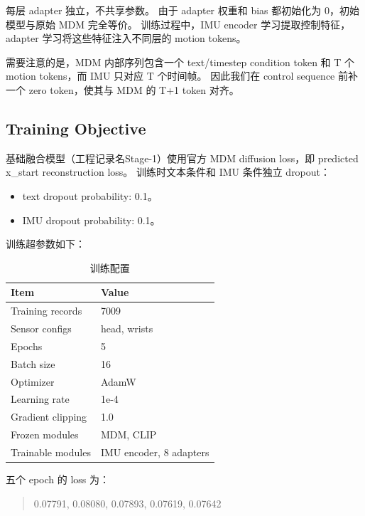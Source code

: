 每层 adapter 独立，不共享参数。
由于 adapter 权重和 bias 都初始化为 0，初始模型与原始 MDM 完全等价。
训练过程中，IMU encoder 学习提取控制特征，adapter 学习将这些特征注入不同层的 motion tokens。

需要注意的是，MDM 内部序列包含一个 text/timestep condition token 和 T 个 motion tokens，而 IMU 只对应 T 个时间帧。
因此我们在 control sequence 前补一个 zero token，使其与 MDM 的 T+1 token 对齐。

\subsection{Training Objective}

基础融合模型（工程记录名Stage-1）使用官方 MDM diffusion loss，即 predicted x\_start reconstruction loss。
训练时文本条件和 IMU 条件独立 dropout：

\begin{itemize}
\item text dropout probability: 0.1。
\item IMU dropout probability: 0.1。
\end{itemize}

训练超参数如下：

\begin{table}[t]
\centering
\caption{训练配置}
\label{tab:result-2}
\footnotesize
\setlength{\tabcolsep}{3pt}
\renewcommand{\arraystretch}{1.15}
\begin{tabularx}{\linewidth}{LL}
\toprule
Item & Value \\
\midrule
Training records & 7009 \\
Sensor configs & head, wrists \\
Epochs & 5 \\
Batch size & 16 \\
Optimizer & AdamW \\
Learning rate & 1e-4 \\
Gradient clipping & 1.0 \\
Frozen modules & MDM, CLIP \\
Trainable modules & IMU encoder, 8 adapters \\
\bottomrule
\end{tabularx}
\end{table}


五个 epoch 的 loss 为：

\begin{quote}0.07791, 0.08080, 0.07893, 0.07619, 0.07642\end{quote}

